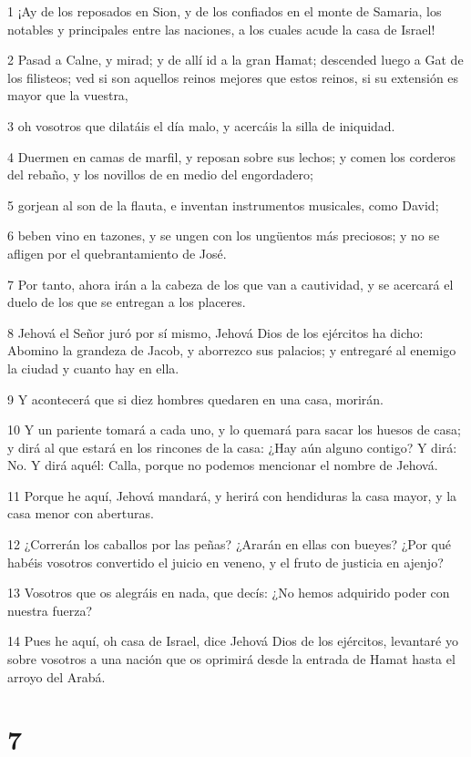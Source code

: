 \par 1 ¡Ay de los reposados en Sion, y de los confiados en el monte de Samaria, los notables y principales entre las naciones, a los cuales acude la casa de Israel!
\par 2 Pasad a Calne, y mirad; y de allí id a la gran Hamat; descended luego a Gat de los filisteos; ved si son aquellos reinos mejores que estos reinos, si su extensión es mayor que la vuestra,
\par 3 oh vosotros que dilatáis el día malo, y acercáis la silla de iniquidad.
\par 4 Duermen en camas de marfil, y reposan sobre sus lechos; y comen los corderos del rebaño, y los novillos de en medio del engordadero;
\par 5 gorjean al son de la flauta, e inventan instrumentos musicales, como David;
\par 6 beben vino en tazones, y se ungen con los ungüentos más preciosos; y no se afligen por el quebrantamiento de José.
\par 7 Por tanto, ahora irán a la cabeza de los que van a cautividad, y se acercará el duelo de los que se entregan a los placeres.
\par 8 Jehová el Señor juró por sí mismo, Jehová Dios de los ejércitos ha dicho: Abomino la grandeza de Jacob, y aborrezco sus palacios; y entregaré al enemigo la ciudad y cuanto hay en ella.
\par 9 Y acontecerá que si diez hombres quedaren en una casa, morirán.
\par 10 Y un pariente tomará a cada uno, y lo quemará para sacar los huesos de casa; y dirá al que estará en los rincones de la casa: ¿Hay aún alguno contigo? Y dirá: No. Y dirá aquél: Calla, porque no podemos mencionar el nombre de Jehová.
\par 11 Porque he aquí, Jehová mandará, y herirá con hendiduras la casa mayor, y la casa menor con aberturas.
\par 12 ¿Correrán los caballos por las peñas? ¿Ararán en ellas con bueyes? ¿Por qué habéis vosotros convertido el juicio en veneno, y el fruto de justicia en ajenjo?
\par 13 Vosotros que os alegráis en nada, que decís: ¿No hemos adquirido poder con nuestra fuerza?
\par 14 Pues he aquí, oh casa de Israel, dice Jehová Dios de los ejércitos, levantaré yo sobre vosotros a una nación que os oprimirá desde la entrada de Hamat hasta el arroyo del Arabá.

\chapter{7}

